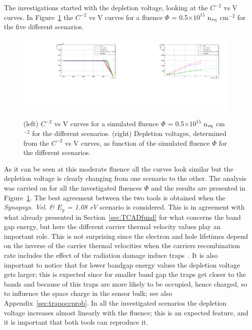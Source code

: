 The investigations started with the depletion voltage, looking at the  $C^{-2}$ vs V curves.
In Figure~\ref{fig:vdepl_Perugia_2015} the $C^{-2}$ vs V curves for a fluence 
$\Phi$ =  0.5$\times10^{15}$ n$_{\rm eq}$ cm$^{-2}$ for the five different scenarios.
\begin{figure}[!htpb]
\centering
\includegraphics[width=0.49\textwidth]{C2V_no_mult_Perugia_fl5e14.pdf}
\includegraphics[width=0.49\textwidth]{vdepl_Perugia_2015.pdf}
\caption{\label{fig:vdepl_Perugia_2015}(left) $C^{-2}$ vs V curves for a simulated fluence $\Phi$ =  0.5$\times10^{15}$ n$_{\rm eq}$ cm$^{-2}$ for the  different scenarios. (right) Depletion voltages, determined from the $C^{-2}$ vs V curves, as function of the simulated fluence $\Phi$ for the  different scenarios.}
\end{figure}

As it can be seen at this moderate fluence all the curves look similar but the depletion voltage is clearly 
changing from one scenario to the other.
The analysis was carried on for all the investigated fluences $\Phi$  and the results are presented in 
Figure~\ref{fig:vdepl_Perugia_2015}. The best agreement between the two tools is obtained 
when the  {\it Synopsys. Vel. \& $E_g$ = 1.08 eV} 
scenario is considered. This is in agreement with what already 
presented in Section~\ref{sec:TCADfund} for what concerns the band gap energy, 
but here the different carrier thermal velocity values play 
an important role. This is not surprising since the  electron and hole 
lifetimes  depend on the inverse of the carrier thermal velocities when the carriers recombination rate 
includes the effect of the radiation damage induce traps~\cite{moll-thesis}. It is also important to notice 
that for lower bandgap energy values the depletion voltage gets larger; this is expected since for smaller 
band gap the traps get closer to the bands and because of this traps are more likely to be occupied, hence charged, so to influence the space charge in the sensor bulk; see also Appendix~\ref{sec:trapoccprob}.
In all the investigated scenarios the depletion voltage increases almost linearly with the fluence; this 
is an expected feature, and it is important that both tools can reproduce it.

